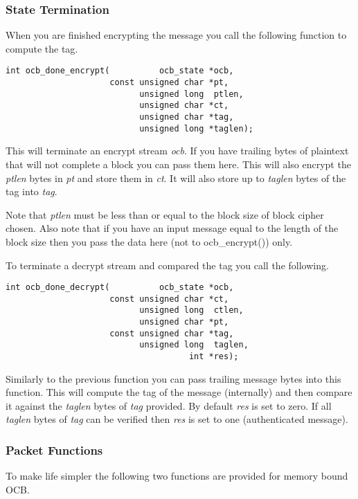 \documentclass[synpaper]{book}
\begin{document}
\subsubsection{State Termination}

When you are finished encrypting the message you call the following function to compute the tag.

\begin{verbatim}
int ocb_done_encrypt(          ocb_state *ocb,
                     const unsigned char *pt,
                           unsigned long  ptlen,
                           unsigned char *ct,
                           unsigned char *tag,
                           unsigned long *taglen);
\end{verbatim}

This will terminate an encrypt stream \textit{ocb}.  If you have trailing bytes of plaintext that will not complete a block
you can pass them here.  This will also encrypt the \textit{ptlen} bytes in \textit{pt} and store them in \textit{ct}.  It will also
store up to \textit{taglen} bytes of the tag into \textit{tag}.

Note that \textit{ptlen} must be less than or equal to the block size of block cipher chosen.  Also note that if you have
an input message equal to the length of the block size then you pass the data here (not to ocb\_encrypt()) only.

To terminate a decrypt stream and compared the tag you call the following.

\begin{verbatim}
int ocb_done_decrypt(          ocb_state *ocb,
                     const unsigned char *ct,
                           unsigned long  ctlen,
                           unsigned char *pt,
                     const unsigned char *tag,
                           unsigned long  taglen,
                                     int *res);
\end{verbatim}
Similarly to the previous function you can pass trailing message bytes into this function.  This will compute the
tag of the message (internally) and then compare it against the \textit{taglen} bytes of \textit{tag} provided.  By default
\textit{res} is set to zero.  If all \textit{taglen} bytes of \textit{tag} can be verified then \textit{res} is set to one (authenticated
message).

\subsubsection{Packet Functions}
To make life simpler the following two functions are provided for memory bound OCB.
\end{document}
